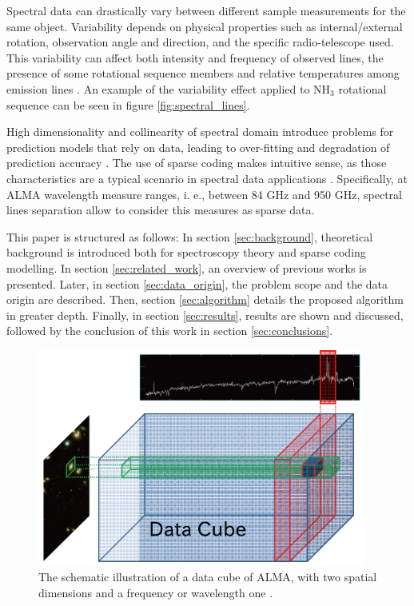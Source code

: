 Spectral data can drastically vary between different sample measurements for the same object.
Variability depends on physical properties such as internal/external rotation, observation angle and direction, and the specific radio-telescope used.  
This variability can affect both intensity and frequency of observed lines, the presence of some rotational sequence members and relative temperatures among emission lines \citep{howley_effect_2005}.
An example of the variability effect applied to NH$_{3}$ rotational sequence can be seen in figure \ref{fig:spectral_lines}. 

High dimensionality and collinearity of spectral domain introduce problems for prediction models that rely on data, leading to over-fitting and degradation of prediction accuracy \citep{howley_effect_2005}.
The use of sparse coding makes intuitive sense, as those characteristics are a typical scenario in spectral data applications \citep{wright_sparse_2010, xiang_learning_2011}.
Specifically, at ALMA wavelength measure ranges, i. e., between 84 GHz and 950 GHz, spectral lines separation allow to consider this measures as sparse data.

This paper is structured as follows:
In section \ref{sec:background}, theoretical background is introduced both for spectroscopy theory and sparse coding modelling.
In section \ref{sec:related_work}, an overview of previous works is presented.
Later, in section \ref{sec:data_origin}, the problem scope and the data origin are described.
Then, section \ref{sec:algorithm} details the proposed algorithm in greater depth.
Finally, in section \ref{sec:results}, results are shown and discussed, followed by the conclusion of this work in section \ref{sec:conclusions}.

\begin{figure}[H]
	\begin{center}
		\includegraphics[width=0.45 \textwidth]{images/cube}
		\caption{The schematic illustration of a data cube of ALMA, with two spatial dimensions and a frequency or wavelength one \citep{eguchi_superluminal_2013}.}
		\label{fig:data_cube}
	\end{center}
\end{figure}